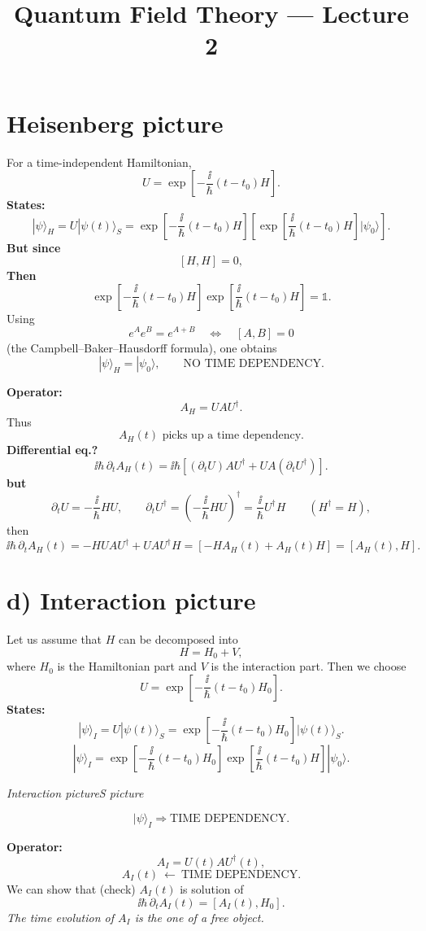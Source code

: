 \documentclass[11pt,a4paper]{article}
\title{Quantum Field Theory --- Lecture 2}
\author{}
\date{}
\begin{document}
\section*{Heisenberg picture}

For a time-independent Hamiltonian,
\[
U=\exp\!\left[-\frac{\ii}{\hbar}(t-t_0)H\right].
\]
\textbf{States:}
\[
|\psi\rangle_H=U|\psi(t)\rangle_S
=\exp\!\left[-\frac{\ii}{\hbar}(t-t_0)H\right]
\left[\exp\!\left[\frac{\ii}{\hbar}(t-t_0)H\right]
|\psi_0\rangle\right].
\]
\textbf{But since}
\[
[H,H]=0,
\]
\textbf{Then}
\[
\exp\!\left[-\frac{\ii}{\hbar}(t-t_0)H\right]
\exp\!\left[\frac{\ii}{\hbar}(t-t_0)H\right]
=\mathbb{1}.
\]
Using
\[
e^A e^B=e^{A+B}
\quad\Longleftrightarrow\quad
[A,B]=0
\]
(the Campbell--Baker--Hausdorff formula), one obtains
\[
|\psi\rangle_H=|\psi_0\rangle,
\qquad\text{NO TIME DEPENDENCY}.
\]

\textbf{Operator:}
\[
A_H=UAU^\dagger.
\]
Thus
\[
A_H(t)\text{ picks up a time dependency}.
\]
\textbf{Differential eq.?}
\[
\ii\hbar\,\partial_t A_H(t)
=\ii\hbar\left[
(\partial_tU)AU^\dagger
+UA(\partial_tU^\dagger)
\right].
\]
\textbf{but}
\[
\partial_tU=-\frac{\ii}{\hbar}HU,
\qquad
\partial_tU^\dagger
=\left(-\frac{\ii}{\hbar}HU\right)^\dagger
=\frac{\ii}{\hbar}U^\dagger H
\qquad (H^\dagger=H),
\]
then
\[
\ii\hbar\,\partial_t A_H(t)
=-HUAU^\dagger+UAU^\dagger H
=[-HA_H(t)+A_H(t)H]
=[A_H(t),H].
\]

\section*{d) Interaction picture}

Let us assume that $H$ can be decomposed into
\[
H=H_0+V,
\]
where $H_0$ is the Hamiltonian part and $V$ is the interaction part. Then we choose
\[
U=\exp\!\left[-\frac{\ii}{\hbar}(t-t_0)H_0\right].
\]
\textbf{States:}
\[
|\psi\rangle_I
=U|\psi(t)\rangle_S
=\exp\!\left[-\frac{\ii}{\hbar}(t-t_0)H_0\right]
|\psi(t)\rangle_S.
\]
\[
|\psi\rangle_I
=\exp\!\left[-\frac{\ii}{\hbar}(t-t_0)H_0\right]
\exp\!\left[\frac{\ii}{\hbar}(t-t_0)H\right]
|\psi_0\rangle.
\]
\begin{center}
\textit{Interaction picture}\qquad\textit{S picture}
\end{center}
\[
|\psi\rangle_I\Longrightarrow\text{TIME DEPENDENCY}.
\]

\textbf{Operator:}
\[
A_I=U(t)AU^\dagger(t),
\]
\[
A_I(t)\ \longleftarrow\ \text{TIME DEPENDENCY}.
\]
We can show that (check) $A_I(t)$ is solution of
\[
\ii\hbar\,\partial_t A_I(t)
=[A_I(t),H_0].
\]
\textit{The time evolution of $A_I$ is the one of a free object.}
\end{document}
